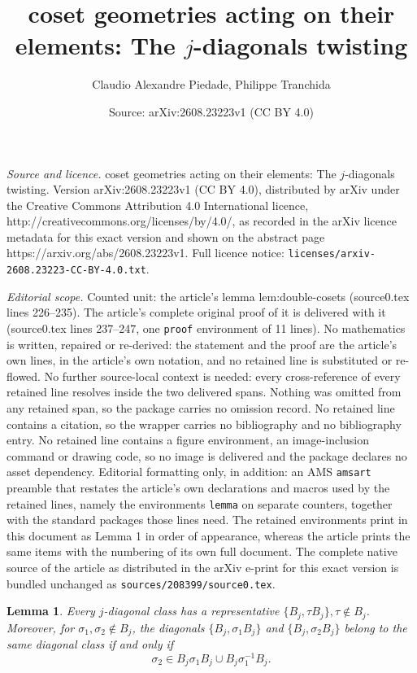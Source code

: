 \documentclass[10pt,a4paper]{amsart}
\title{coset geometries acting on their elements: The $j$-diagonals twisting}
\author{Claudio Alexandre Piedade, Philippe Tranchida}
\date{Source: arXiv:2608.23223v1 (CC BY 4.0)}
\newtheorem{lemma}{Lemma}
\begin{document}
\maketitle

\noindent\emph{Source and licence.} coset geometries acting on their elements: The $j$-diagonals twisting. Version arXiv:2608.23223v1 (CC BY 4.0), distributed by arXiv under the Creative Commons Attribution 4.0 International licence, http://creativecommons.org/licenses/by/4.0/, as recorded in the arXiv licence metadata for this exact version and shown on the abstract page https://arxiv.org/abs/2608.23223v1. Full licence notice: \texttt{licenses/arxiv-2608.23223-CC-BY-4.0.txt}.\par\smallskip

\noindent\textit{Editorial scope.} Counted unit: the article's lemma lem:double-cosets (source0.tex lines 226--235). The article's complete original proof of it is delivered with it (source0.tex lines 237--247, one \texttt{proof} environment of 11 lines). No mathematics is written, repaired or re-derived: the statement and the proof are the article's own lines, in the article's own notation, and no retained line is substituted or re-flowed.  No further source-local context is needed: every cross-reference of every retained line resolves inside the two delivered spans.  Nothing was omitted from any retained span, so the package carries no omission record.  No retained line contains a citation, so the wrapper carries no bibliography and no bibliography entry.  No retained line contains a figure environment, an image-inclusion command or drawing code, so no image is delivered and the package declares no asset dependency.  Editorial formatting only, in addition: an AMS \texttt{amsart} preamble that restates the article's own declarations and macros used by the retained lines, namely the environments \texttt{lemma} on separate counters, together with the standard packages those lines need.  The retained environments print in this document as Lemma 1 in order of appearance, whereas the article prints the same items with the numbering of its own full document.  The complete native source of the article as distributed in the arXiv e-print for this exact version is bundled unchanged as \texttt{sources/208399/source0.tex}.
\begin{lemma}\label{lem:double-cosets}
Every $j$-diagonal class has a representative
$\{B_j,\tau B_j\}, \tau\notin B_j$.
Moreover, for $\sigma_1,\sigma_2\notin B_j$, the diagonals $\{B_j,\sigma_1B_j\}$ and
$\{B_j,\sigma_2B_j\}$
belong to the same diagonal class if and only if
\begin{equation}\label{eq:doublecosetdiagonal}
\sigma_2\in B_j\sigma_1B_j\cup B_j\sigma_1^{-1}B_j.
\end{equation}
\end{lemma}
\end{document}
